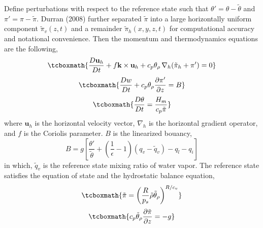 \documentclass[a4paper,11pt]{article}
\begin{document}
Define perturbations with respect to the reference state such that $\theta' = \theta - \tilde{\theta}$ and $\pi' = \pi - \tilde{\pi}$. Durran (2008) further separated $\tilde{\pi}$ into a large horizontally uniform component $\tilde{\pi}_v(z,t)$ and a remainder $\tilde{\pi}_h(x,y,z,t)$ for computational accuracy and notational convenience. Then the momentum and thermodynamics equations are the following,
\begin{equation}
\tcboxmath{
\frac{D \mathbf{u}_h}{D t}  + f {\mathbf{k}} \times \mathbf{u}_h +  c_p \theta_{\rho}\,\nabla_h(\tilde{\pi}_h + \pi') = 0
}
\end{equation}
\begin{equation}
 \tcboxmath{
 \frac{D w}{D t} + c_p \theta_{\rho} \frac{\partial \pi'}{\partial z} = B%
 }
\end{equation}
\begin{equation}
\tcboxmath{
 \frac{D \theta }{D t} = \frac{H_m}{c_p \tilde{\pi}}
 }
\end{equation}
where $\mathbf{u}_h$ is the horizontal velocity vector, $\nabla_h$ is the horizontal gradient operator, and $f$ is the Coriolis parameter. $B$ is the linearized bouancy,
\begin{equation}
B = g\left[\frac{\theta'}{\tilde{\theta}} + \left(\frac{1}{\epsilon}-1 \right)(q_v-\tilde{q}_{v}) - q_l- q_i\right]
\end{equation}
in which, $\tilde{q}_v$ is the reference state mixing ratio of water vapor.
The reference state satisfies the equation of state and the hydrostatic balance equation,
\begin{equation}
\tcboxmath{
 \tilde{\pi} = \left( \frac{R}{p_s} \tilde{\rho} \tilde{\theta}_{\rho} \right)^{R/c_v}
 }
 \label{eqn:state}
\end{equation}
\begin{equation}
 \tcboxmath{
 c_p \tilde{\theta}_{\rho} \frac{\partial \tilde{\pi}}{\partial z} = -g 
 }
 \label{eqn:hystatic}
\end{equation}
\end{document}
